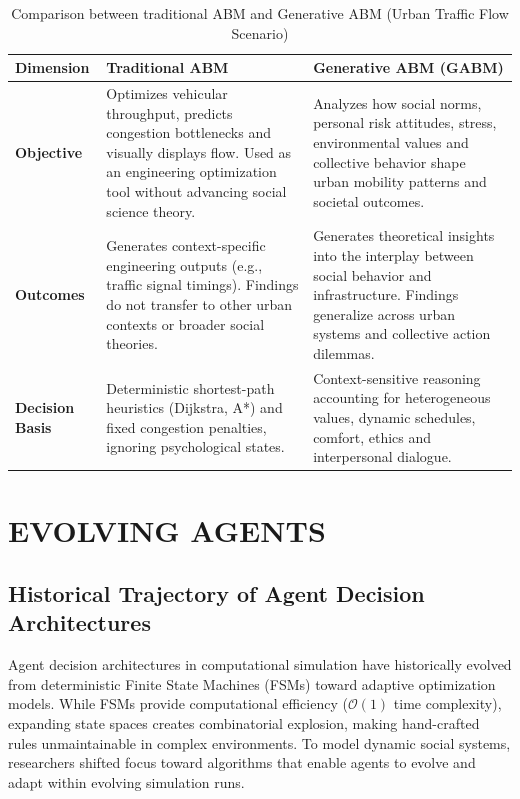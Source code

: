 \documentclass[12pt,a4paper]{report}
\begin{document}
\begin{table}[H]
\centering
\caption{Comparison between traditional ABM and Generative ABM (Urban Traffic Flow Scenario)}
\label{tab:table1_traffic}
\vspace{0.2cm}
\setlength{\tabcolsep}{4pt}
\renewcommand{\arraystretch}{1.15}
\small
\begin{tabular}{|p{2.3cm}|p{6.0cm}|p{6.3cm}|}
\hline
\textbf{Dimension} & \textbf{Traditional ABM} & \textbf{Generative ABM (GABM)} \\
\hline
\textbf{Objective} & Optimizes vehicular throughput, predicts congestion bottlenecks and visually displays flow. Used as an engineering optimization tool without advancing social science theory. & Analyzes how social norms, personal risk attitudes, stress, environmental values and collective behavior shape urban mobility patterns and societal outcomes. \\
\hline
\textbf{Outcomes} & Generates context-specific engineering outputs (e.g., traffic signal timings). Findings do not transfer to other urban contexts or broader social theories. & Generates theoretical insights into the interplay between social behavior and infrastructure. Findings generalize across urban systems and collective action dilemmas. \\
\hline
\textbf{Decision Basis} & Deterministic shortest-path heuristics (Dijkstra, A*) and fixed congestion penalties, ignoring psychological states. & Context-sensitive reasoning accounting for heterogeneous values, dynamic schedules, comfort, ethics and interpersonal dialogue. \\
\hline
\end{tabular}
\end{table}


\chapter{EVOLVING AGENTS}
\label{chap:evolving_agents}

\section{Historical Trajectory of Agent Decision Architectures}
\label{sec:history_agents}

Agent decision architectures in computational simulation have historically evolved from deterministic Finite State Machines (FSMs) toward adaptive optimization models. While FSMs provide computational efficiency ($\mathcal{O}(1)$ time complexity), expanding state spaces creates combinatorial explosion, making hand-crafted rules unmaintainable in complex environments. To model dynamic social systems, researchers shifted focus toward algorithms that enable agents to evolve and adapt within evolving simulation runs.
\end{document}
